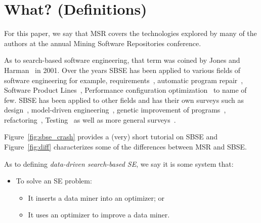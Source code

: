 \documentclass[sigconf,anonymous,review]{acmart}
\newcommand\TODO[1]{\textcolor{ScarletRed}{\textbf{\colorbox{yellow}{\small TODO:}} \emph{#1}}\xspace}
\begin{document}


\section{What? (Definitions)}

For this paper, we say that MSR covers the technologies
explored by many of the authors at the annual Mining Software Repositories
conference.

As to search-based software engineering, that term was coined by Jones and Harman~\cite{harman2001search} in 2001.
Over the years SBSE has been applied to various fields of software engineering for example, requirements~\cite{ZhangHL13, chen2017beyond}, automatic program repair~\cite{le2012genprog}, Software Product Lines~\cite{chen2017sampling, sayyad13a, guo2017smtibea}, Performance configuration optimization~\cite{nair2017faster,nair2017using, guo2017data, oh2017finding, nair2018finding} to name of few. SBSE has been applied to other fields and has their own surveys such as design~\cite{raiha2010survey}, model-driven engineering~\cite{boussaid2017survey}, genetic improvement of programs~\cite{petke2017genetic}, refactoring~\cite{mariani2017systematic}, Testing~\cite{silva2017systematic, khari2017extensive} as well as more general surveys~\cite{clarke2003reformulating, harman2007current}. 

 Figure~\ref{fig:sbse_crash} provides a (very) short tutorial on SBSE and  Figure~\ref{fig:diff} characterizes some of the differences between MSR 
and SBSE.
 
As to defining {\em data-driven search-based SE},
we say it is some system that:
\begin{itemize}[leftmargin=*]
\item To solve  an SE problem:
\begin{itemize}
\item
It inserts  a data miner into an optimizer; or
\item
It uses an optimizer  to improve a data  miner.
\end{itemize}
\end{itemize}
\end{document}
